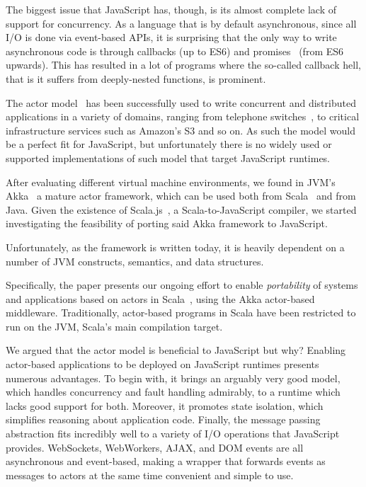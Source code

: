 \documentclass{sig-alternate}
\begin{document}
The biggest issue that JavaScript has, though, is its almost complete lack of support for concurrency. As a language that is by default asynchronous, since all I/O is done via event-based APIs, it is surprising that the only way to write asynchronous code is through callbacks (up to ES6) and promises~\cite{LiskovS88} (from ES6 upwards). This has resulted in a lot of programs where the so-called callback hell, that is it suffers from deeply-nested functions, is prominent.

The actor model~\cite{Hewitt77,Agha} has been successfully used to write concurrent and distributed applications in a variety of domains, ranging from telephone switches~\cite{ErlangApplications}, to critical infrastructure services such as Amazon's S3 and so on. As such the model would be a perfect fit for JavaScript, but unfortunately there is no widely used or supported implementations of such model that target JavaScript runtimes.

After evaluating different virtual machine environments, we found in JVM\rq{s}\cite{Lindholm-Yellin} Akka~\cite{Akka} a mature actor framework, which can be used both from Scala~\cite{OderskyR14} and from Java. Given the existence of Scala.js~\cite{Scalajs}, a Scala-to-JavaScript compiler, we started investigating the feasibility of porting said Akka framework to JavaScript.

Unfortunately, as the framework is written today, it is heavily dependent on a number of JVM constructs, semantics, and data structures. %

Specifically, the paper presents our ongoing effort to enable {\em portability} of systems and applications based on actors in Scala~\cite{ActorsInScala}, using the Akka actor-based middleware. Traditionally, actor-based programs in Scala have been restricted to run on the JVM, Scala's main compilation target. %

We argued that the actor model is beneficial to JavaScript but why? Enabling actor-based applications to be deployed on JavaScript runtimes presents numerous advantages. To begin with, it brings an arguably very good model, which handles concurrency and fault handling admirably, to a runtime which lacks good support for both. Moreover, it promotes state isolation, which simplifies reasoning about application code. Finally, the message passing abstraction fits incredibly well to a variety of I/O operations that JavaScript provides. WebSockets, WebWorkers, AJAX, and DOM events are all asynchronous and event-based, making a wrapper that forwards events as messages to actors at the same time convenient and simple to use.
\end{document}
